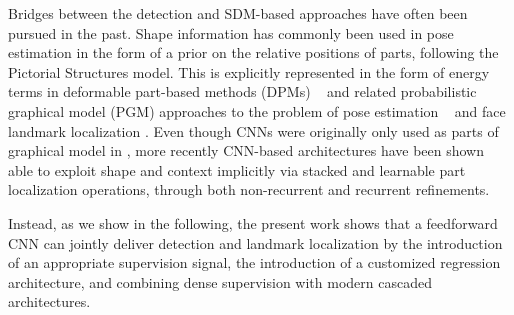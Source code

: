 Bridges between the detection and SDM-based approaches have often been pursued in the past.
Shape information has commonly been used in pose estimation in the form of a prior on the relative positions of parts, following the Pictorial Structures model\citep{fischler1973representation}. This is explicitly represented in the form of energy terms in deformable part-based methods
(DPMs) ~\citep{felzenszwalb2008discriminatively} and related probabilistic graphical model (PGM) approaches to the problem of pose estimation ~\citep{andriluka2009pictorial,sapp2010adaptive,yang2011articulated,sapp2013modec} and face landmark localization \citep{zhu2012face}. Even though CNNs were originally only used as parts of graphical model in \citep{jain2013learning,tompson2014joint,chen2014articulated,yang2016end},  more recently CNN-based architectures have been shown able to exploit shape and context implicitly via  stacked and  learnable part localization operations, through both non-recurrent \citep{wei2016convolutional,bulat2016human,newell2016stacked} and recurrent \citep{belagiannis2016recurrent} refinements. 

Instead, as we show in the following,  the present work shows that a feedforward CNN can jointly deliver detection and landmark localization by the introduction of an appropriate supervision signal, the introduction of a customized regression architecture, and combining dense supervision with modern cascaded architectures. 